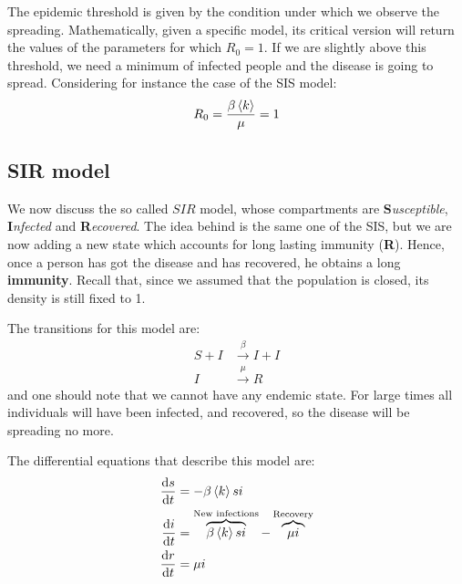 \documentclass[../main/main.tex]{subfiles}
\begin{document}
The epidemic threshold is given by the condition under which we observe the spreading. Mathematically, given a specific model, its critical version will return the values of the parameters for which $ R_0 = 1 $. If we are slightly above this threshold, we need a minimum of infected people and the disease is going to spread. Considering for instance the case of the SIS model:
\begin{equation}
  R_0 = \frac{\beta \expval{k} }{\mu } = 1
\end{equation}


\subsection{SIR model}
We now discuss the so called $SIR$ model, whose compartments are \textbf{S}\textit{usceptible}, \textbf{I}\textit{nfected} and \textbf{R}\textit{ecovered}. The idea behind is the same one of the SIS, but we are now adding a new state which accounts for long lasting immunity (\textbf{R}). Hence, once a person has got the disease and has recovered, he obtains a long \textbf{immunity}. Recall that, since we assumed that the population is closed, its density is still fixed to 1.

The transitions for this model are:
\begin{equation}
\begin{split}
  S + I &\overset{\beta }{\rightarrow } I + I  \\
  I &\overset{\mu }{\rightarrow } R
\end{split}
\end{equation}
and one should note that we cannot have any endemic state. For large times all individuals will have been infected, and recovered, so the disease will be spreading no more.

The differential equations that describe this model are:
\begin{equation}
\begin{split}
  \dv{s}{t} &= - \beta \expval{k} si  \\
  \dv{i}{t} &= \overbrace{\beta \expval{k} si}^{\text{New infections}}  - \overbrace{\mu i}^{\text{Recovery}} \\
  \dv{r}{t} &= \mu i
\end{split}
\end{equation}
\end{document}
